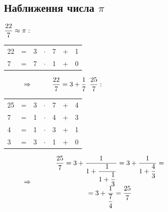 \documentclass[a4paper,12pt, centered]{bookest}
\newcommand\tab[1][1cm]{\hspace*{#1}}
\begin{document}
\begin{appendices}
\section{Наближення числа $\pi$}
$\dfrac{22}7\approx\pi:\tab $
\begin{tabular}{ll|l|llll}
\cline{3-3}
22 & = & 3 & $\cdot$ & 7 & + & 1 \\
7  & = & 7 & $\cdot$ & 1 & + & 0 \\ \cline{3-3}
\end{tabular}$\tab\Rightarrow\tab \dfrac{22}7=3+\dfrac17\\\\$
$\dfrac{25}7:\tab $
\begin{tabular}{ll|l|llll}
\cline{3-3}
25 & = & 3 & $\cdot$ & 7 & + & 4 \\
7  & = & 1 & $\cdot$ & 4 & + & 3 \\
4  & = & 1 & $\cdot$ & 3 & + & 1 \\
3  & = & 3 & $\cdot$ & 1 & + & 0 \\ \cline{3-3}
\end{tabular}$\tab\Rightarrow\tab\begin{array}{c}
	\dfrac {25}7=3+\dfrac1{1+\dfrac1{1+\dfrac13}}=3+\dfrac1{1+\dfrac43}=\\=3+\dfrac1{\dfrac74}=\dfrac{25}7
\end{array}$











\end{appendices}
\end{document}
